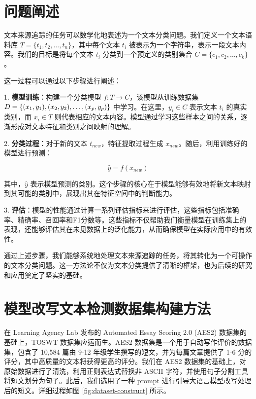 \section{问题阐述}
\label{sec:TOSWT-task}

文本来源追踪的任务可以数学化地表述为一个文本分类问题。我们定义一个文本语料库 \( T = \{t_1, t_2, \ldots, t_n\} \)，其中每个文本 \( t_i \) 被表示为一个字符串，表示一段文本内容。我们的目标是将每个文本 \( t_i \) 分类到一个预定义的类别集合 \( C = \{c_1, c_2, \ldots, c_k\} \)。

这一过程可以通过以下步骤进行阐述：

1. \textbf{模型训练}：构建一个分类模型 \( f: T \to C \)，该模型从训练数据集 $ D = \{(x_1, y_1),\\ (x_2, y_2), \ldots, (x_p, y_p)\} $ 中学习。在这里，\( y_i \in C \) 表示文本 \( t_i \) 的真实类别，而 \( x_i \in T \) 则代表相应的文本内容。模型通过学习这些样本之间的关系，逐渐形成对文本特征和类别之间映射的理解。

2. \textbf{分类过程}：对于新的文本 \( t_{new} \)，特征提取过程生成 \( x_{new} \)。随后，利用训练好的模型进行预测：

   \[
   \hat{y} = f(x_{new})
   \]

   其中，\( \hat{y} \) 表示模型预测的类别。这个步骤的核心在于模型能够有效地将新文本映射到其可能的类别中，展现出其在特征空间中的判断能力。

3. \textbf{评估}：模型的性能通过计算一系列评估指标来进行评估，这些指标包括准确率、精确率、召回率和F1分数等。这些指标不仅帮助我们衡量模型在训练集上的表现，还能够评估其在未见数据上的泛化能力，从而确保模型在实际应用中的有效性。

通过上述步骤，我们能够系统地处理文本来源追踪的任务，将其转化为一个可操作的文本分类问题。这一方法论不仅为文本分类提供了清晰的框架，也为后续的研究和应用奠定了坚实的基础。


\section{模型改写文本检测数据集构建方法}
\label{sec:TOSWT-gen}

在 Learning Agency Lab 发布的 Automated Essay Scoring 2.0 (AES2) 数据集的基础上，TOSWT 数据集应运而生。AES2 数据集是一个用于自动写作评价的数据集，包含了 10,584 篇由 9-12 年级学生撰写的短文，并为每篇文章提供了 1-6 分的评分，其中高质量的文本将获得更高的评分。我们在 AES2 数据集的基础上，对原始数据进行了清洗，利用正则表达式替换非 ASCII 字符，并使用句子分割工具将短文划分为句子。此后，我们选用了一种 prompt 进行引导大语言模型改写处理后的短文。详细过程如图 \ref{fig:dataset-construct} 所示。

